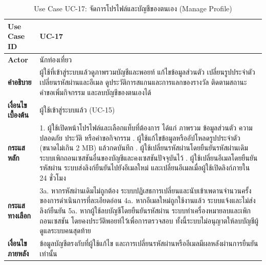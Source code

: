 \begin{table}[H]
\centering
\caption{Use Case UC-17: จัดการโปรไฟล์และบัญชีของตนเอง (Manage Profile)}
\label{tab:uc17}
\begin{tabular}{|p{3.2cm}|p{10cm}|}
\hline
\textbf{Use Case ID} & UC-17 \\ \hline
\textbf{Actor} & นักท่องเที่ยว \\ \hline
\textbf{คำอธิบาย} & ผู้ใช้ที่เข้าสู่ระบบแล้วดูภาพรวมบัญชีและพอยท์ แก้ไขข้อมูลส่วนตัว เปลี่ยนรูปประจำตัว เปลี่ยนรหัสผ่านและอีเมล ดูประวัติการสแกนและการแลกของรางวัล ติดตามสถานะคำขอเพิ่มกิจกรรม และลบบัญชีของตนเองได้ \\ \hline
\textbf{เงื่อนไขเบื้องต้น} & ผู้ใช้เข้าสู่ระบบแล้ว (UC-15) \\ \hline
\textbf{กระแสหลัก} & 1. ผู้ใช้เปิดหน้าโปรไฟล์และเลือกแท็บที่ต้องการ ได้แก่ ภาพรวม ข้อมูลส่วนตัว ความปลอดภัย ประวัติ หรือคำขอกิจกรรม \newline 2. ผู้ใช้แก้ไขข้อมูลหรืออัปโหลดรูปประจำตัว (ขนาดไม่เกิน 2 MB) แล้วกดบันทึก \newline 3. ผู้ใช้เปลี่ยนรหัสผ่านโดยยืนยันรหัสผ่านเดิม ระบบเพิกถอนเซสชันอื่นของบัญชีและคงเซสชันปัจจุบันไว้ \newline 4. ผู้ใช้เปลี่ยนอีเมลโดยยืนยันรหัสผ่าน ระบบส่งลิงก์ยืนยันไปยังอีเมลใหม่ และเปลี่ยนอีเมลเมื่อผู้ใช้เปิดลิงก์ภายใน 24 ชั่วโมง \\ \hline
\textbf{กระแสทางเลือก} & 3a. หากรหัสผ่านเดิมไม่ถูกต้อง ระบบปฏิเสธการเปลี่ยนและนับเข้าเพดานจำนวนครั้งของการดำเนินการที่ละเอียดอ่อน \newline 4a. หากอีเมลใหม่ถูกใช้งานแล้ว ระบบแจ้งและไม่ส่งลิงก์ยืนยัน \newline 5a. หากผู้ใช้ลบบัญชีโดยยืนยันรหัสผ่าน ระบบทำเครื่องหมายลบและเพิกถอนเซสชัน โดยคงประวัติพอยท์ไว้เพื่อการตรวจสอบ ทั้งนี้ระบบไม่อนุญาตให้ลบบัญชีผู้ดูแลระบบคนสุดท้าย \\ \hline
\textbf{เงื่อนไขภายหลัง} & ข้อมูลบัญชีตรงกับที่ผู้ใช้แก้ไข และการเปลี่ยนรหัสผ่านหรืออีเมลมีผลหลังผ่านการยืนยันเท่านั้น \\
\hline
\end{tabular}
\end{table}

